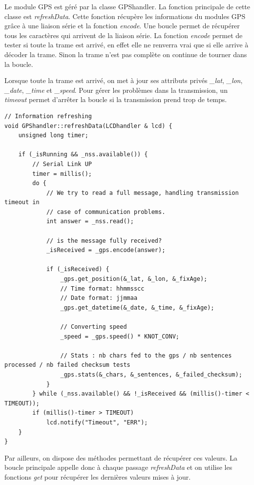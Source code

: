 \documentclass[a4paper,12pt,titlepage]{article}
\begin{document}
Le module GPS est géré par la classe GPShandler.
La fonction principale de cette classe est \emph{refreshData}.
Cette fonction récupère les informations du modules GPS grâce à une liaison série et la fonction \emph{encode}.
Une boucle permet de récupérer tous les caractères qui arrivent de la liaison série.
La fonction \emph{encode} permet de tester si toute la trame est arrivé, en effet elle ne renverra vrai que si elle arrive à décoder la trame. Sinon la trame n'est pas complète on continue de tourner dans la boucle.

Lorsque toute la trame est arrivé, on met à jour ses attributs privés \emph{\_lat}, \emph{\_lon}, \emph{\_date}, \emph{\_time} et \emph{\_speed}.
Pour gérer les problèmes dans la transmission, un \emph{timeout} permet d'arrêter la boucle si la transmission prend trop de temps.


\begin{lstlisting}[caption={resfreshData},label={refreshData}]
// Information refreshing
void GPShandler::refreshData(LCDhandler & lcd) {
    unsigned long timer;

    if (_isRunning && _nss.available()) {
        // Serial Link UP
        timer = millis();
        do {
            // We try to read a full message, handling transmission timeout in
            // case of communication problems.
            int answer = _nss.read();

            // is the message fully received?
            _isReceived = _gps.encode(answer);

            if (_isReceived) {
                _gps.get_position(&_lat, &_lon, &_fixAge);
                // Time format: hhmmsscc
                // Date format: jjmmaa
                _gps.get_datetime(&_date, &_time, &_fixAge);

                // Converting speed
                _speed = _gps.speed() * KNOT_CONV;

                // Stats : nb chars fed to the gps / nb sentences processed / nb failed checksum tests
                _gps.stats(&_chars, &_sentences, &_failed_checksum);
            }
        } while (_nss.available() && !_isReceived && (millis()-timer < TIMEOUT));
        if (millis()-timer > TIMEOUT)
            lcd.notify("Timeout", "ERR");
    }
}
\end{lstlisting}

Par ailleurs, on dispose des méthodes permettant de récupérer ces valeurs. La boucle principale appelle donc à chaque passage \emph{refreshData} et on utilise les fonctions \emph{get}
pour récupérer les dernières valeurs mises à jour.
\end{document}
